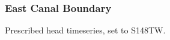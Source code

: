 %
%


\clearpage
\subsubsection{East Canal Boundary}

Prescribed head timeseries, set to S148TW.


\clearpage
